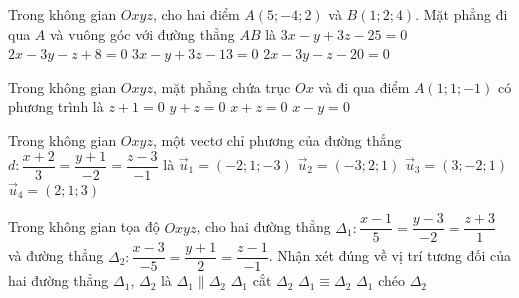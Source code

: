 \begin{ex}%
Trong không gian $O x y z$, cho hai điểm $A(5 ;-4 ; 2)$ và $B(1 ; 2 ; 4)$. Mặt phẳng đi qua $A$ và vuông góc với đường thẳng $A B$ là
\choice
{$3x-y+3z-25=0$}
{$2x-3y-z+8=0$}
{$3x-y+3z-13=0$}
{\True $2x-3y-z-20=0$}
\end{ex}

\begin{ex}%
Trong không gian $Oxyz$, mặt phẳng chứa trục $Ox$ và đi qua điểm $A(1;1;-1)$ có phương trình là
\choice
{$z+1=0$}
{\True $y+z=0$}
{$x+z=0$}
{$x-y=0$}
\end{ex}

\begin{ex}%
Trong không gian $Oxyz$, một vectơ chỉ phương của đường thẳng $d\colon \dfrac{x+2}{3}=\dfrac{y+1}{-2}=\dfrac{z-3}{-1}$ là
\choice
{$\overrightarrow{u}_1=(-2;1;-3)$}
{\True $\overrightarrow{u}_2=(-3;2;1)$}
{$\overrightarrow{u}_3=(3;-2;1)$}
{$\overrightarrow{u}_4=(2;1;3)$}
\end{ex}

\begin{ex}%
Trong không gian tọa độ $Oxyz$, cho hai đường thẳng $\Delta_1\colon \dfrac{x-1}{5}=\dfrac{y-3}{-2}=\dfrac{z+3}{1}$ và đường thẳng $\Delta_2\colon \dfrac{x-3}{-5}=\dfrac{y+1}{2}=\dfrac{z-1}{-1}$. Nhận xét đúng về vị trí tương đối của hai đường thẳng $\Delta_1$, $\Delta_2$ là
\choice
{\True $\Delta_1\parallel\Delta_2$}
{$\Delta_1$ cắt $\Delta_2$}
{$\Delta_1\equiv\Delta_2$}
{$\Delta_1$ chéo $\Delta_2$}
\end{ex}


